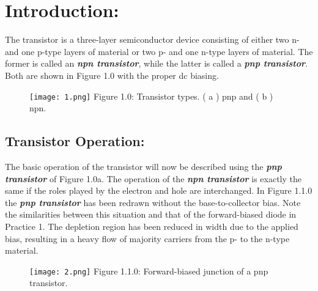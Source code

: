 \section{Introduction:}

The transistor is a three-layer semiconductor device consisting of either two n- and one p-type layers of material or two p- and one n-type layers of material. The former is called an {\bfseries\itshape npn transistor}, while the latter is called a {\bfseries\itshape pnp transistor}. Both are shown in Figure 1.0 with the proper dc biasing.

\begin{figure}[H]
\texttt{[image: 1.png]}
\centering \linebreak \linebreak Figure 1.0: Transistor types. ( a ) pnp and ( b ) npn.
\end{figure}

\subsection{Transistor Operation:}

\begin{multicols}{2}
The basic operation of the transistor will now be described using the {\bfseries\itshape pnp transistor} of Figure 1.0a. The operation of the {\bfseries\itshape npn transistor} is exactly the same if the roles played by the electron and hole are interchanged. In Figure 1.1.0 the {\bfseries\itshape pnp transistor} has been redrawn without the base-to-collector bias. Note the similarities between this situation and that of the forward-biased diode in Practice 1. The depletion region has been reduced in width due to the applied bias, resulting in a heavy flow of majority carriers from the p- to the n-type material.

\begin{figure}[H]
\texttt{[image: 2.png]}
\centering \linebreak \linebreak Figure 1.1.0: Forward-biased junction of a pnp transistor.
\end{figure}
\end{multicols}

